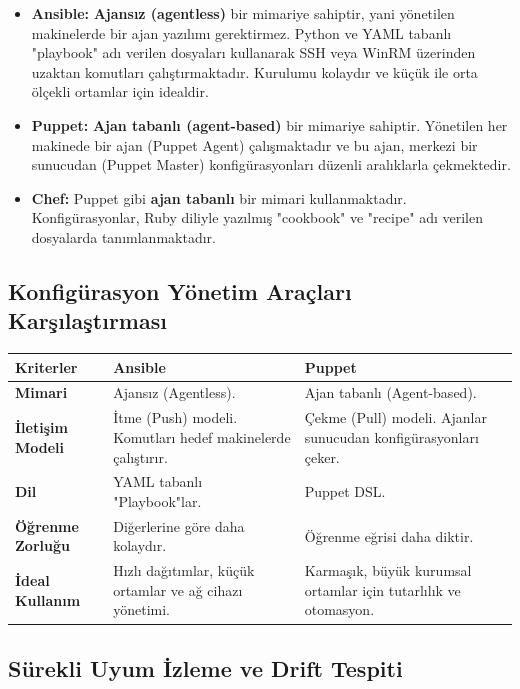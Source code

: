 \begin{itemize}
    \item \textbf{Ansible:} \textbf{Ajansız (agentless)} bir mimariye sahiptir, yani yönetilen makinelerde bir ajan yazılımı gerektirmez. Python ve YAML tabanlı "playbook" adı verilen dosyaları kullanarak SSH veya WinRM üzerinden uzaktan komutları çalıştırmaktadır. Kurulumu kolaydır ve küçük ile orta ölçekli ortamlar için idealdir.
    \item \textbf{Puppet:} \textbf{Ajan tabanlı (agent-based)} bir mimariye sahiptir. Yönetilen her makinede bir ajan (Puppet Agent) çalışmaktadır ve bu ajan, merkezi bir sunucudan (Puppet Master) konfigürasyonları düzenli aralıklarla çekmektedir.
    \item \textbf{Chef:} Puppet gibi \textbf{ajan tabanlı} bir mimari kullanmaktadır. Konfigürasyonlar, Ruby diliyle yazılmış "cookbook" ve "recipe" adı verilen dosyalarda tanımlanmaktadır.
\end{itemize}

\subsection{Konfigürasyon Yönetim Araçları Karşılaştırması}

\begin{tabular}{|p{4cm}|p{6cm}|p{4cm}|}
\hline
\hline
\textbf{Kriterler} & \textbf{Ansible} & \textbf{Puppet}  \\
\hline
\hline
\textbf{Mimari} & Ajansız (Agentless). & Ajan tabanlı (Agent-based).  \\
\hline
\hline
\textbf{İletişim Modeli} & İtme (Push) modeli. Komutları hedef makinelerde çalıştırır. & Çekme (Pull) modeli. Ajanlar sunucudan konfigürasyonları çeker.  \\
\hline
\hline
\textbf{Dil} & YAML tabanlı "Playbook"lar. & Puppet DSL.  \\
\hline
\hline
\textbf{Öğrenme Zorluğu} & Diğerlerine göre daha kolaydır. & Öğrenme eğrisi daha diktir.  \\
\hline
\hline
\textbf{İdeal Kullanım} & Hızlı dağıtımlar, küçük ortamlar ve ağ cihazı yönetimi. & Karmaşık, büyük kurumsal ortamlar için tutarlılık ve otomasyon.  \\
\hline
\hline
\hline
\end{tabular}

\subsection{Sürekli Uyum İzleme ve Drift Tespiti}

